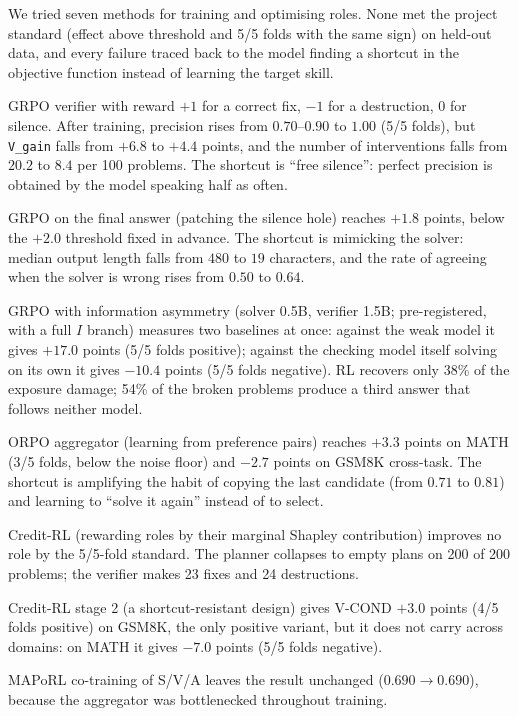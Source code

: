 \documentclass[11pt,a4paper]{article}
\begin{document}
We tried seven methods for training and optimising roles. None met the project standard (effect above threshold and 5/5 folds with the same sign) on held-out data, and every failure traced back to the model finding a shortcut in the objective function instead of learning the target skill.

\begin{description}\itemsep5pt
\setlength{\leftmargini}{1.6em}\setlength{\labelsep}{0.5em}
\item[\textbf{First.}] GRPO verifier with reward $+1$ for a correct fix, $-1$ for a destruction, $0$ for silence. After training, precision rises from $0.70$--$0.90$ to $1.00$ (5/5 folds), but \texttt{V\_gain} falls from $+6.8$ to $+4.4$ points, and the number of interventions falls from $20.2$ to $8.4$ per 100 problems. The shortcut is ``free silence'': perfect precision is obtained by the model speaking half as often.


\item[\textbf{Second.}] GRPO on the final answer (patching the silence hole) reaches $+1.8$ points, below the $+2.0$ threshold fixed in advance. The shortcut is mimicking the solver: median output length falls from $480$ to $19$ characters, and the rate of agreeing when the solver is wrong rises from $0.50$ to $0.64$.

\item[\textbf{Third.}] GRPO with information asymmetry (solver 0.5B, verifier 1.5B; pre-registered, with a full $I$ branch) measures two baselines at once: against the weak model it gives $+17.0$ points (5/5 folds positive); against the checking model itself solving on its own it gives $-10.4$ points (5/5 folds negative). RL recovers only 38\% of the exposure damage; 54\% of the broken problems produce a third answer that follows neither model.

\item[\textbf{Fourth.}] ORPO aggregator (learning from preference pairs) reaches $+3.3$ points on MATH (3/5 folds, below the noise floor) and $-2.7$ points on GSM8K cross-task. The shortcut is amplifying the habit of copying the last candidate (from $0.71$ to $0.81$) and learning to ``solve it again'' instead of to select.

\item[\textbf{Fifth.}] Credit-RL (rewarding roles by their marginal Shapley contribution) improves no role by the 5/5-fold standard. The planner collapses to empty plans on 200 of 200 problems; the verifier makes 23 fixes and 24 destructions.

\item[\textbf{Sixth.}] Credit-RL stage 2 (a shortcut-resistant design) gives V-COND $+3.0$ points (4/5 folds positive) on GSM8K, the only positive variant, but it does not carry across domains: on MATH it gives $-7.0$ points (5/5 folds negative).

\item[\textbf{Seventh.}] MAPoRL co-training of S/V/A leaves the result unchanged ($0.690 \to 0.690$), because the aggregator was bottlenecked throughout training.
\end{description}
\end{document}
